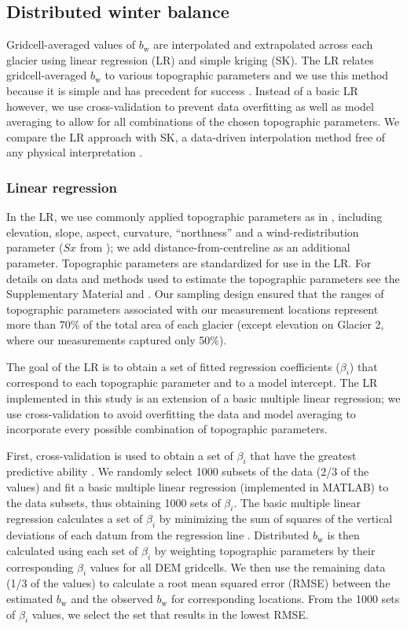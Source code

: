 \documentclass[twocolumn, letterpaper]{igs}
\begin{document}
\subsection{Distributed winter balance}

Gridcell-averaged values of $b_\mathrm{w}$ are interpolated and extrapolated across each glacier using linear regression (LR) and simple kriging (SK). The LR relates gridcell-averaged $b_\mathrm{w}$ to various topographic parameters and we use this method because it is simple and has precedent for success \citep[e.g.][]{McGrath2015}. Instead of a basic LR however, we use cross-validation to prevent data overfitting as well as model averaging to allow for all combinations of the chosen topographic parameters. We compare the LR approach with SK, a data-driven interpolation method free of any physical interpretation \citep[e.g.][]{Hock1999}.

\subsubsection{Linear regression}

In the LR, we use commonly applied topographic parameters as in \cite{McGrath2015}, including elevation, slope, aspect, curvature, ``northness'' and a wind-redistribution parameter ($Sx$ from \cite{Winstral2002}); we add distance-from-centreline as an additional parameter. Topographic parameters are standardized for use in the LR. For details on data and methods used to estimate the topographic parameters see the Supplementary Material and \cite{Pulwicki2017}. Our sampling design ensured that the ranges of topographic parameters associated with our measurement locations represent more than 70\% of the total area of each glacier (except elevation on Glacier 2, where our measurements captured only 50\%). 

The goal of the LR is to obtain a set of fitted regression coefficients ($\beta_i$) that correspond to each topographic parameter and to a model intercept. The LR implemented in this study is an extension of a basic multiple linear regression; we use cross-validation to avoid overfitting the data and model averaging to incorporate every possible combination of topographic parameters. 

First, cross-validation is used to obtain a set of $\beta_i$ that have the greatest predictive ability \citep{Kohavi1995}. We randomly select 1000 subsets of the data (2/3 of the values) and fit a basic multiple linear regression (implemented in MATLAB) to the data subsets, thus obtaining 1000 sets of $\beta_i$. The basic multiple linear regression calculates a set of $\beta_i$ by minimizing the sum of squares of the vertical deviations of each datum from the regression line \citep{Davis1986}. Distributed $b_\mathrm{w}$ is then calculated using each set of $\beta_i$ by weighting topographic parameters by their corresponding $\beta_i$ values for all DEM gridcells. We then use the remaining data (1/3 of the values) to calculate a root mean squared error (RMSE) between the estimated $b_\mathrm{w}$ and the observed $b_\mathrm{w}$ for corresponding locations. From the 1000 sets of $\beta_i$ values, we select the set that results in the lowest RMSE. 
\end{document}
